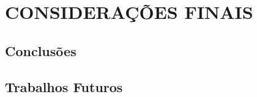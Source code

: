 
\chapter{CONSIDERAÇÕES FINAIS}
\label{chap:conclusao}

\section{\textbf{Conclusões}}

\section{\textbf{Trabalhos Futuros}}

\lipsum[6-9] %


